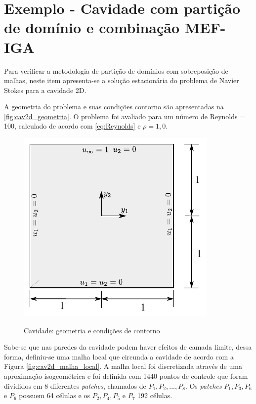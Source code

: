 \section{Exemplo - Cavidade com partição de domínio e combinação MEF-IGA} \label{capitulo:cap5:Exemplo}

Para verificar a metodologia de partição de domínios com sobreposição de malhas, neste item apresenta-se a solução estacionária do problema de Navier Stokes para a cavidade 2D.

A geometria do problema e suas condições contorno são apresentadas na \autoref{fig:cav2d_geometria}. O problema foi avaliado para um número de Reynolds = 100, calculado de acordo com \autoref{eq:Reynolds} e $\rho = 1,0$.

\begin{figure}[!htbp]
	\caption{Cavidade: geometria e condições de contorno} 
	\centering
	{\includegraphics[scale=1.3,trim=0cm 0cm 0cm 0cm, clip=true]{Imagens/Cap5/cav2d_geometria.pdf}}
	\label{fig:cav2d_geometria}
\end{figure}

Sabe-se que nas paredes da cavidade podem haver efeitos de camada limite, dessa forma, definiu-se uma malha local que circunda a cavidade de acordo com a Figura \ref{fig:cav2d_malha_local}. A malha local foi discretizada através de uma aproximação isogeométrica e foi definida com 1440 pontos de controle que foram divididos em 8 diferentes \textit{patches}, chamados de $P_{1},P_{2},...,P_{8}$. Os \textit{patches} $P_{1},P_{3},P_{6}$ e $P_{6}$ possuem 64 células e os $P_{2},P_{4},P_{5}$ e $P_{7}$ 192 células.

